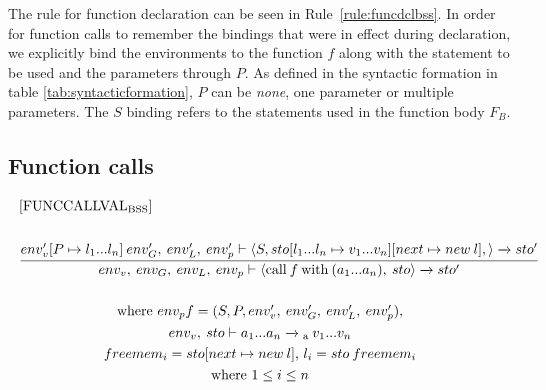 \noindent
The rule for function declaration can be seen in Rule~\ref{rule:funcdclbss}. In order for function calls to remember the bindings that were in effect during declaration, we explicitly bind the environments to the function $f$ along with the statement to be used and the parameters through $P$. As defined in the syntactic formation in table \ref{tab:syntacticformation}, $P$ can be \textit{none}, one parameter or multiple parameters. The $S$ binding refers to the statements used in the function body $F_B$. 

\subsection*{Function calls}
\begin{equation} \label{EQ:FUNCCALLVALRAP}
\begin{split}
\begin{minipage}{\linewidth}
$[\text{FUNCCALLVAL}_\text{BSS}]$
\end{minipage}
\\\\
\begin{minipage}{\linewidth}
\centering
$\cfrac{env'_v[P \mapsto l_1...l_n] \: env'_G, \: env'_L, \: env'_p \vdash \langle S, sto[l_1...l_n \mapsto v_1...v_n][next \mapsto new \: l], \rangle \xrightarrow{} sto'}{env_v, \: env_G, \: env_L, \: env_p \vdash \langle \text{call} \: f \: \text{with} \: (a_1...a_n), \: sto \rangle \xrightarrow{} sto'}$
\end{minipage}
\\\\
\begin{minipage}{\linewidth}
\centering
where $env_p f = (S, P, env'_v, \: env_G', \: env'_L, \: env'_p),$
\end{minipage}
\\
\begin{minipage}{\linewidth}
\centering
$env_v, \: sto \vdash a_1...a_n \xrightarrow{}\textsubscript{a} \: v_1...v_n$
\end{minipage}
\\
\begin{minipage}{\linewidth}
\centering
$freemem_i = sto[next \mapsto new \: l]$, $l_i = sto \: freemem_i$
\end{minipage}
\\
\begin{minipage}{\linewidth}
\centering
where $1 \leq i \leq n $
\end{minipage}
\end{split}
\end{equation}
